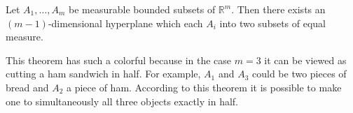 \documentclass[12pt]{article}
\begin{document}
Let $A_1,\ldots,A_m$ be measurable bounded subsets of $\mathbb{R}^m$. Then there exists an $(m-1)$-dimensional hyperplane which  each $A_i$ into two subsets of equal measure.

This theorem has such a colorful  because in the case $m=3$ it can be viewed as cutting a ham sandwich in half. For example, $A_1$ and $A_3$ could be two pieces of bread and $A_2$ a piece of ham. According to this theorem it is possible to make one  to simultaneously  all three objects exactly in half.
\end{document}
